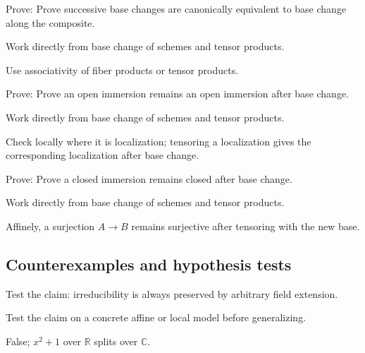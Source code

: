 \begin{exercise}[Composition]\label{exr:vi24-expand-07}
Prove: Prove successive base changes are canonically equivalent to base change along the composite.
\end{exercise}
\begin{hint}
Work directly from base change of schemes and tensor products.
\end{hint}
\begin{solution}
Use associativity of fiber products or tensor products.
\end{solution}

\begin{exercise}\label{exr:vi24-expand-08}
Prove: Prove an open immersion remains an open immersion after base change.
\end{exercise}
\begin{hint}
Work directly from base change of schemes and tensor products.
\end{hint}
\begin{solution}
Check locally where it is localization; tensoring a localization gives the corresponding localization after base change.
\end{solution}

\begin{exercise}\label{exr:vi24-expand-09}
Prove: Prove a closed immersion remains closed after base change.
\end{exercise}
\begin{hint}
Work directly from base change of schemes and tensor products.
\end{hint}
\begin{solution}
Affinely, a surjection $A\to B$ remains surjective after tensoring with the new base.
\end{solution}

\subsection*{Counterexamples and hypothesis tests}

\begin{exercise}[Irreducibility]\label{exr:vi24-expand-10}
Test the claim: irreducibility is always preserved by arbitrary field extension.
\end{exercise}
\begin{hint}
Test the claim on a concrete affine or local model before generalizing.
\end{hint}
\begin{solution}
False; $x^2+1$ over $\mathbb R$ splits over $\mathbb C$.
\end{solution}

